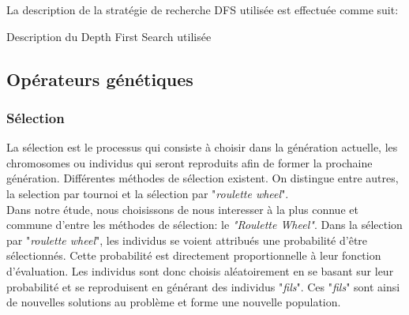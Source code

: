 \documentclass[12pt,a4paper]{article}
\begin{document}
	\vspace*{.5cm}
	La description de la stratégie de recherche DFS utilisée est effectuée comme suit: \\
	
	\begin{algorithm}[H]
		\caption{Description du Depth First Search utilisée}
 		\BlankLine
		\BlankLine 		
	\end{algorithm}	
	
	\subsection{Opérateurs génétiques}
		\subsubsection{Sélection}
		
		La sélection est le processus qui consiste à choisir dans la génération actuelle, les chromosomes ou individus qui seront reproduits afin de former la prochaine génération. Différentes méthodes de sélection existent. On distingue entre autres, la selection par tournoi et la sélection par "\emph{roulette wheel}". \\
		\hspace*{.5cm} Dans notre étude, nous choisissons de nous interesser à la plus connue et commune d'entre les méthodes de sélection: le \emph{"Roulette Wheel"}. Dans la sélection par "\emph{roulette wheel}", les individus se voient attribués une probabilité d'être sélectionnés. Cette probabilité est directement proportionnelle à leur fonction d'évaluation. Les individus sont donc choisis aléatoirement en se basant sur leur probabilité et se reproduisent en générant des individus "\emph{fils}". Ces "\emph{fils}" sont ainsi de nouvelles solutions au problème et forme une nouvelle population.		
		
\end{document}
